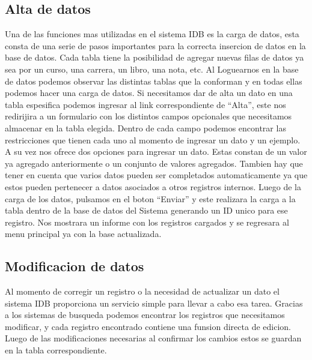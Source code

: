 \documentclass[a4paper,10pt]{article}
\begin{document}
\subsection{Alta de datos}
Una de las funciones mas utilizadas en el sistema IDB es la carga de datos, esta consta de una serie de pasos importantes para la correcta insercion de datos en la base de datos. Cada tabla tiene la posibilidad de agregar nuevas filas de datos ya sea por un curso, una carrera, un libro, una nota, etc. Al Loguearnos en la base de datos podemos observar las distintas tablas que la conforman y en todas ellas podemos hacer una carga de datos. 
Si necesitamos dar de alta un dato en una tabla espesifica podemos ingresar al link correspondiente de “Alta”, este nos redirijira a un formulario con los distintos campos opcionales que necesitamos almacenar en la tabla elegida. 
Dentro de cada campo podemos encontrar las restricciones que tienen cada uno al momento de ingresar un dato y un ejemplo. A su vez nos ofrece dos opciones para ingresar un dato. Estas constan de un valor ya agregado anteriormente o un conjunto de valores agregados. Tambien hay que tener en cuenta que varios datos pueden ser completados automaticamente ya que estos pueden pertenecer a datos asociados a otros registros internos. 
Luego de la carga de los datos, pulsamos en el boton “Enviar” y este realizara la carga a la tabla dentro de la base de datos del Sistema generando un ID unico para ese registro. Nos mostrara un informe con los registros cargados y se regresara al menu principal ya con la base actualizada.

\subsection{Modificacion de datos}

Al momento de corregir un registro o la necesidad de actualizar un dato el sistema IDB proporciona un servicio simple para llevar a cabo esa tarea. Gracias a los sistemas de busqueda podemos encontrar los registros que necesitamos modificar, y cada registro encontrado contiene una funsion directa de edicion. Luego de las modificaciones necesarias al confirmar los cambios estos se guardan en la tabla correspondiente.
 
\end{document}
